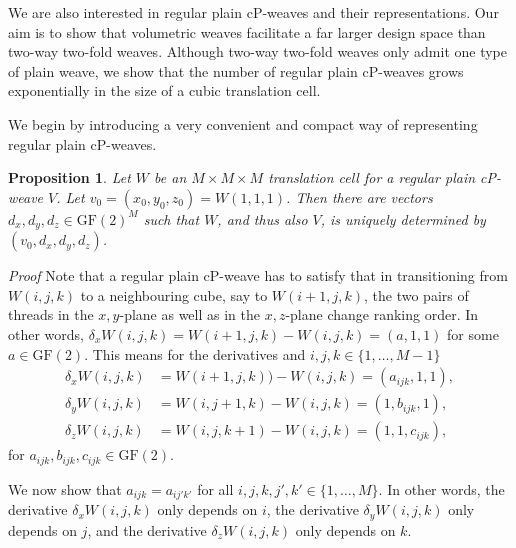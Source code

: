 \documentclass[unnumsec,webpdf,contemporary,large]{oup-authoring-template}%
\theoremstyle{thmstyleone}%
\newtheorem{proposition}[theorem]{Proposition}%
\theoremstyle{thmstyletwo}%
\theoremstyle{thmstylethree}%
\newcommand{\GF}{{\mathrm{GF}}}
\begin{document}
We are also interested in regular plain cP-weaves and their representations. Our aim is to show that volumetric weaves facilitate a far larger design space than two-way two-fold weaves. Although two-way two-fold weaves only admit one type of plain weave, we show that the number of regular plain cP-weaves grows exponentially in the size of a cubic translation cell.

We begin by introducing a very convenient and compact way of representing regular plain cP-weaves.

\begin{proposition}\label{prop:representationplain}
Let $W$ be an 
$M\times M\times M$  translation cell for a regular plain cP-weave $V$. Let $v_0 = (x_0, y_0, z_0)= W(1,1,1)$. Then there are vectors $d_x, d_y, d_z \in \GF(2)^{M}$ such that $W$, and thus also $V$, is uniquely determined by $(v_0,d_x,d_y,d_z)$.
\end{proposition}

\noindent\textit{Proof}
Note that a regular plain cP-weave has to satisfy that in transitioning from  $W(i,j,k)$ to a neighbouring cube, say to $W(i+1,j,k)$, the two pairs of threads in the $x,y$-plane as well as in the $x,z$-plane change ranking order. In other words,  $\delta_x W(i,j,k) = W(i+1,j,k) - W(i,j,k) = (a,1,1)$ for some $a\in \GF(2)$. This means for the derivatives and $i,j,k\in \{1,\ldots, M-1\}$
\begin{equation}\label{eq:plainconstraint}
\begin{split}
\delta_x W(i,j,k) &= W(i+1,j,k))- W(i,j,k) = (a_{ijk},1,1),\\
\delta_y W(i,j,k) &= W(i,j+1,k) - W(i,j,k) = (1,b_{ijk},1),\\
\delta_z W(i,j,k) &= W(i,j,k+1) - W(i,j,k) = (1,1,c_{ijk}),    
\end{split}
\end{equation}
for $a_{ijk},b_{ijk},c_{ijk} \in \GF(2).$

We now show that $a_{ijk} = a_{ij'k'}$ for all $i,j,k,j',k'\in\{1,\ldots,M\}$. In other words, the derivative $\delta_x W(i,j,k)$ only depends on $i$, the derivative $\delta_y W(i,j,k)$ only depends on $j$, and the derivative $\delta_z W(i,j,k)$ only depends on $k$.
\end{document}
